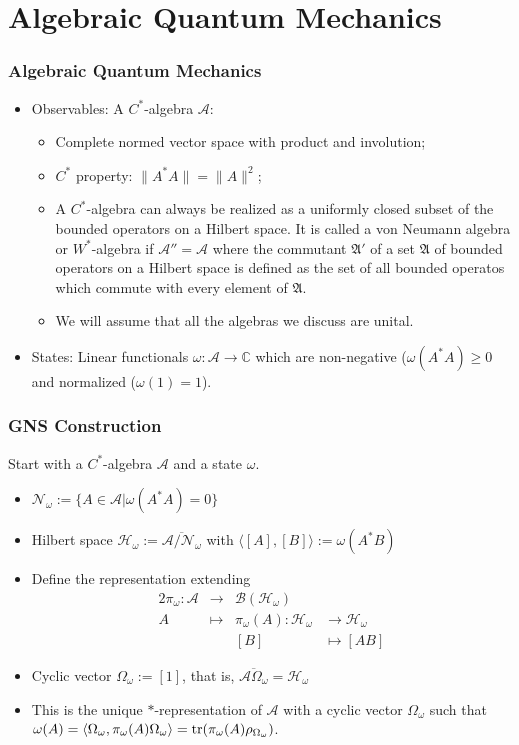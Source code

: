 \documentclass{beamer}
\begin{document}
\section{Algebraic Quantum Mechanics}

\begin{frame}
	\frametitle{Algebraic Quantum Mechanics}
	\begin{itemize}
		\item Observables: A $C^*$-algebra $\mathcal{A}$:
		\begin{itemize}
			\item Complete normed vector space with product and involution;
			\item $C^*$ property: $\|A^*A\|=\|A\|^2$;
			\item A $C^*$-algebra can always be realized as a uniformly closed subset of the bounded operators on a Hilbert space\cite{Bratteli1987}. It is called a von Neumann algebra or $W^*$-algebra if $\mathcal{A}''=\mathcal{A}$ where the commutant $\mathfrak{A}'$ of a set $\mathfrak{A}$ of bounded operators on a Hilbert space is defined as the set of all bounded operatos which commute with every element of $\mathfrak{A}$.
			\item We will assume that all the algebras we discuss are unital.
		\end{itemize}
		\item States:  Linear functionals $\omega:\mathcal{A}\rightarrow\mathbb{C}$ which are non-negative ($\omega(A^*A)\geq 0$ and normalized ($\omega(1)=1$).
	\end{itemize}
\end{frame}

\begin{frame}
	\frametitle{GNS Construction}
	Start with a $C^*$-algebra $\mathcal{A}$ and a state $\omega$.
	\begin{itemize}
		\item $\mathcal{N}_\omega:=\{A\in\mathcal{A}|\omega(A^*A)=0\}$
		\item Hilbert space $\mathcal{H}_\omega := \overline{\mathcal{A}/\mathcal{N}_\omega}$ with $\langle [A], [B]\rangle := \omega(A^*B)$ 
		\item Define the representation extending
		\begin{alignat*}{2}
			\pi_\omega:\mathcal{A} & \rightarrow &\mathcal{B}(\mathcal{H}_\omega) \\
			A & \mapsto & \pi_\omega(A):\mathcal{H}_\omega & \rightarrow\mathcal{H}_\omega \\
			&& [B] & \mapsto [AB]
		\end{alignat*}
		\item Cyclic vector $\Omega_\omega := [1]$, that is, $\overline{\mathcal{A}\Omega_\omega}=\mathcal{H}_\omega$
		\item This is the unique $*$-representation of $\mathcal{A}$ with a cyclic vector $\Omega_\omega$ such that $\omega(A)=\langle\Omega_\omega,\pi_\omega(A)\Omega_\omega\rangle=\tr(\pi_\omega(A)\rho_{\Omega_\omega})$.
	\end{itemize}
\end{frame}
\end{document}
